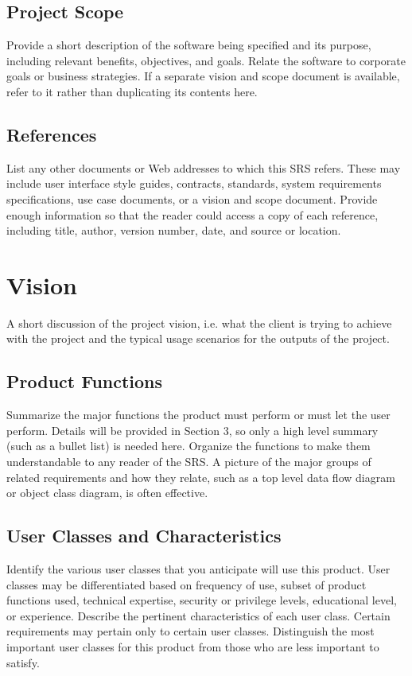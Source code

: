 \documentclass{scrreprt}
\begin{document}
\section{Project Scope}
Provide a short description of the software being specified and its purpose, 
including relevant benefits, objectives, and goals. Relate the software to 
corporate goals or business strategies. If a separate vision and scope document 
is available, refer to it rather than duplicating its contents here.

\section{References}
List any other documents or Web addresses to which this SRS refers. These may 
include user interface style guides, contracts, standards, system requirements 
specifications, use case documents, or a vision and scope document. Provide 
enough information so that the reader could access a copy of each reference, 
including title, author, version number, date, and source or location.


\chapter{Vision}

A short discussion of the project vision, i.e. what the client is trying to achieve with the project and the typical usage scenarios for the outputs of the project.

\section{Product Functions}
Summarize the major functions the product must perform or must let the user 
perform. Details will be provided in Section 3, so only a high level summary 
(such as a bullet list) is needed here. Organize the functions to make them 
understandable to any reader of the SRS. A picture of the major groups of 
related requirements and how they relate, such as a top level data flow diagram 
or object class diagram, is often effective.

\section{User Classes and Characteristics}
Identify the various user classes that you anticipate will use this product.  
User classes may be differentiated based on frequency of use, subset of product 
functions used, technical expertise, security or privilege levels, educational 
level, or experience. Describe the pertinent characteristics of each user class.  
Certain requirements may pertain only to certain user classes. Distinguish the 
most important user classes for this product from those who are less important 
to satisfy.
\end{document}

